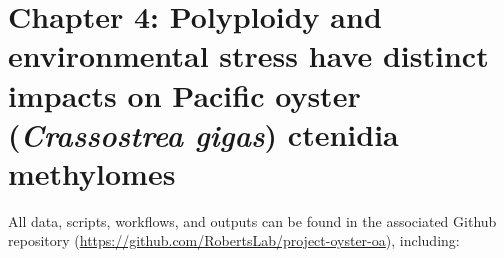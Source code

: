 \documentclass [11pt, proquest] {uwthesis}[2015/03/03]
\begin{document}
\hypertarget{chapter-4-polyploidy-and-environmental-stress-have-distinct-impacts-on-pacific-oyster-crassostrea-gigas-ctenidia-methylomes}{%
\section{\texorpdfstring{Chapter 4: Polyploidy and environmental stress have distinct impacts on Pacific oyster (\emph{Crassostrea gigas}) ctenidia methylomes}{Chapter 4: Polyploidy and environmental stress have distinct impacts on Pacific oyster (Crassostrea gigas) ctenidia methylomes}}\label{chapter-4-polyploidy-and-environmental-stress-have-distinct-impacts-on-pacific-oyster-crassostrea-gigas-ctenidia-methylomes}}

All data, scripts, workflows, and outputs can be found in the associated Github repository (\url{https://github.com/RobertsLab/project-oyster-oa}), including:
\end{document}
